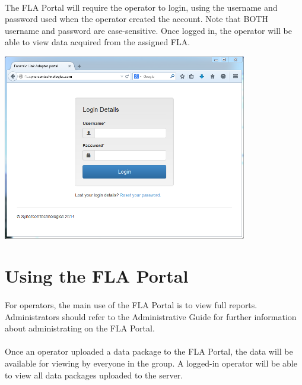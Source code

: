 \documentclass[11pt, oneside]{book}
\begin{document}
\noindent\begin{minipage}{0.45\textwidth}%
	\paragraph{  }
The FLA Portal will require the operator to login, using the username and password used when the operator created the account. Note that BOTH username and password are case-sensitive.
Once logged in, the operator will be able to view data acquired from
the assigned FLA.
\end{minipage}%
\hfill%
\begin{minipage}{0.45\textwidth} 
\includegraphics[width=0.8\textwidth]{../media/fla_portal_screenshots/login_screen}
\end{minipage}


\section{Using the FLA Portal}
\paragraph{  }
For operators, the main use of the FLA Portal is to view full reports. Administrators should refer to the Administrative Guide for further information about administrating on the FLA Portal.
\paragraph{  }
Once an operator uploaded a data package to the FLA Portal, the data will be available for viewing by everyone in the group. A logged-in operator
will be able to view all data packages uploaded to the server.
\end{document}
